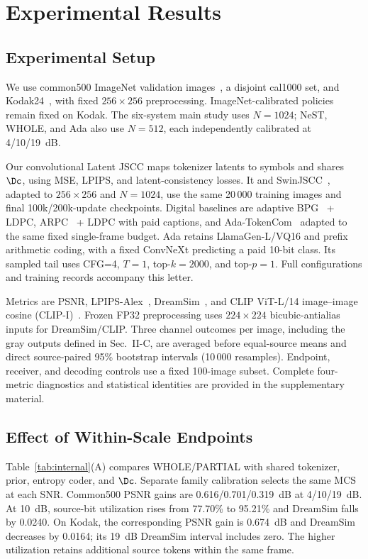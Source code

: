 \section{Experimental Results}
\ifCLASSOPTIONonecolumn\fi
\subsection{Experimental Setup}
We use common500 ImageNet validation images~\cite{imagenet}, a disjoint cal1000 set, and Kodak24~\cite{kodak}, with fixed $256\times256$ preprocessing. ImageNet-calibrated policies remain fixed on Kodak. The six-system main study uses $N=1024$; NeST, WHOLE, and Ada also use $N=512$, each independently calibrated at 4/10/19~dB.

Our convolutional Latent JSCC maps tokenizer latents to symbols and shares $\Dc$, using MSE, LPIPS, and latent-consistency losses. It and SwinJSCC~\cite{swinjscc}, adapted to $256\times256$ and $N=1024$, use the same 20\,000 training images and final 100k/200k-update checkpoints. Digital baselines are adaptive BPG~\cite{bpg} + LDPC, ARPC~\cite{arpc} + LDPC with paid captions, and Ada-TokenCom~\cite{adatokencom} adapted to the same fixed single-frame budget. Ada retains LlamaGen-L/VQ16 and prefix arithmetic coding, with a fixed ConvNeXt predicting a paid 10-bit class. Its sampled tail uses CFG=4, $T=1$, top-$k=2000$, and top-$p=1$. Full configurations and training records accompany this letter.

Metrics are PSNR, LPIPS-Alex~\cite{lpips}, DreamSim~\cite{dreamsim}, and CLIP ViT-L/14 image--image cosine (CLIP-I)~\cite{clip}. Frozen FP32 preprocessing uses $224\times224$ bicubic-antialias inputs for DreamSim/CLIP. Three channel outcomes per image, including the gray outputs defined in Sec.~II-C, are averaged before equal-source means and direct source-paired 95\% bootstrap intervals (10\,000 resamples). Endpoint, receiver, and decoding controls use a fixed 100-image subset. Complete four-metric diagnostics and statistical identities are provided in the supplementary material.

\ifCLASSOPTIONonecolumn\else\fi
\subsection{Effect of Within-Scale Endpoints}

Table~\ref{tab:internal}(A) compares WHOLE/PARTIAL with shared tokenizer, prior, entropy coder, and $\Dc$. Separate family calibration selects the same MCS at each SNR. Common500 PSNR gains are 0.616/0.701/0.319~dB at 4/10/19~dB. At 10~dB, source-bit utilization rises from 77.70\% to 95.21\% and DreamSim falls by 0.0240. On Kodak, the corresponding PSNR gain is 0.674~dB and DreamSim decreases by 0.0164; its 19~dB DreamSim interval includes zero. The higher utilization retains additional source tokens within the same frame.

